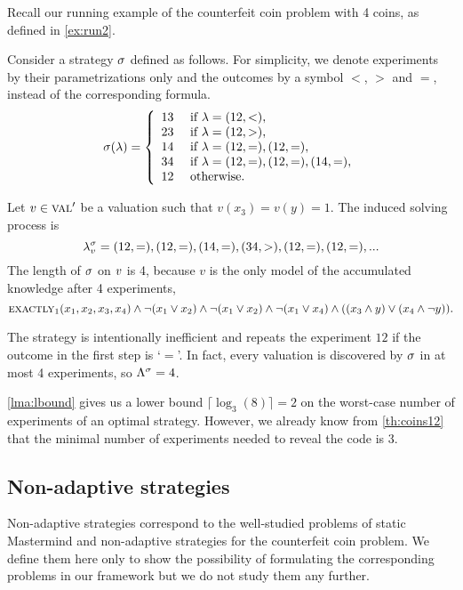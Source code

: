 \begin{example} \label{ex:run2}
Recall our running example of the counterfeit coin problem with 4 coins,
as defined in \ref{ex:run2}.

Consider a strategy $\sigma$ defined as follows.
For simplicity, we denote experiments by their parametrizations only
  and the outcomes by a symbol $<$, $>$ and $=$,
  instead of the corresponding formula.
\[
\sigma(\lambda) = \left\{\begin{array}{ll}
13 & \textrm{ if } \lambda = (12, <), \\
23 & \textrm{ if } \lambda = (12, >),\\
14 & \textrm{ if } \lambda = (12, =), (12, =), \\
34 & \textrm{ if } \lambda = (12, =), (12, =), (14, =), \\
12 & \textrm{ otherwise.}
\end{array}\right.
\]

Let $v\in\textsc{val}'$ be a valuation such that $v(x_3) = v(y) = 1$.
The induced solving process is
\[
\lambda^{\sigma}_{v} = (12, =), (12, =), (14, =), (34, >), (12, =), (12, =), ...
\]
The length of $\sigma$ on $v$ is 4, because $v$ is the only model of
  the accumulated knowledge after 4 experiments,
\[
\textsc{exactly}_1(x_1,x_2,x_3,x_4) \wedge \neg(x_1 \vee x_2) \wedge \neg(x_1 \vee x_2)
\wedge \neg(x_1 \vee x_4) \wedge ((x_3 \wedge y) \vee (x_4 \wedge \neg y)).
\]

The strategy is intentionally inefficient and repeats the experiment $12$
if the outcome in the first step is `$=$'.
In fact, every valuation is discovered by $\sigma$ in at most 4 experiments,
  so $\Lambda^{\sigma} = 4$.

\autoref{lma:lbound} gives us a lower bound $ \lceil\log_3(8)\rceil = 2$
 on the worst-case number of experiments of an optimal strategy.
However, we already know from \autoref{th:coins12} that the minimal number
  of experiments needed to reveal the code is 3.
\end{example}

\subsection{Non-adaptive strategies}

Non-adaptive strategies correspond to the well-studied problems of
  static Mastermind and
  non-adaptive strategies for
  the counterfeit coin problem\cite{mm-static}\cite{coins-nonadaptive}.
We define them here only to show the possibility of formulating the
  corresponding problems
  in our framework but we do not study them any further.

